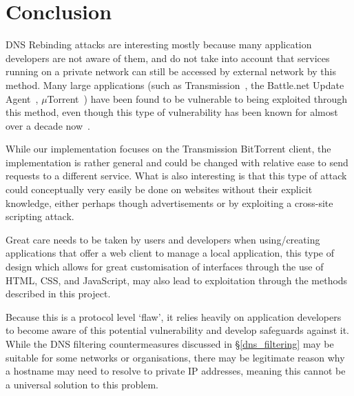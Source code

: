 \chapter{Conclusion}

DNS Rebinding attacks are interesting mostly because many application
developers are not aware of them, and do not take into account that services
running on a private network can still be accessed by external network by this
method. Many large applications (such as Transmission~\cite{tavis_report}, the
Battle.net Update Agent~\cite{battle_net_vuln},
$\mu$Torrent~\cite{utorrent_vuln})
have been found to be vulnerable to being exploited through this method, even
though this type of vulnerability has been known for almost over a decade
now~\cite{jackson2009protecting}.

While our implementation focuses on the Transmission BitTorrent client, the
implementation is rather general and could be changed with relative ease to
send requests to a different service. What is also interesting is that this
type of attack could conceptually very easily be done on websites without
their explicit knowledge, either perhaps though advertisements or by exploiting
a cross-site scripting attack.

Great care needs to be taken by users and developers when using/creating
applications that offer a web client to manage a local application, this type
of design which allows for great customisation of interfaces through the use of
HTML, CSS, and JavaScript, may also lead to exploitation through the methods
described in this project.

Because this is a protocol level `flaw', it relies heavily on application
developers to become aware of this potential vulnerability and develop
safeguards against it. While the DNS filtering countermeasures discussed in
\S\ref{dns_filtering} may be suitable for some networks or organisations, there
may be legitimate reason why a hostname may need to resolve to private IP
addresses, meaning this cannot be a universal solution to this problem.

